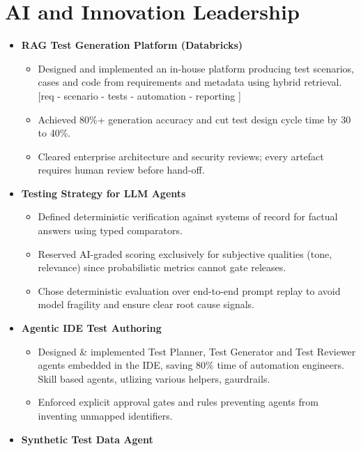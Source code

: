 \documentclass[11pt, a4paper]{article}
\begin{document}
\section{AI and Innovation Leadership}

\begin{itemize}
    \item \textbf{RAG Test Generation Platform (Databricks)}
    \begin{itemize}
        \item Designed and implemented an in-house platform producing test scenarios, cases and code from requirements and metadata using hybrid retrieval. [req - scenario - tests - automation - reporting ]
        \item Achieved 80\%+ generation accuracy and cut test design cycle time by 30 to 40\%.
        \item Cleared enterprise architecture and security reviews; every artefact requires human review before hand-off.
    \end{itemize}
    \item \textbf{Testing Strategy for LLM Agents}
    \begin{itemize}
        \item Defined deterministic verification against systems of record for factual answers using typed comparators.
        \item Reserved AI-graded scoring exclusively for subjective qualities (tone, relevance) since probabilistic metrics cannot gate releases.
        \item Chose deterministic evaluation over end-to-end prompt replay to avoid model fragility and ensure clear root cause signals.
    \end{itemize}
    \item \textbf{Agentic IDE Test Authoring}
    \begin{itemize}
        \item Designed & implemented  Test Planner, Test Generator and Test Reviewer agents embedded in the IDE, saving 80\% time of automation engineers. Skill based agents, utlizing various helpers, gaurdrails.
        \item Enforced explicit approval gates and rules preventing agents from inventing unmapped identifiers.
    \end{itemize}
    \item \textbf{Synthetic Test Data Agent}

\end{itemize}
\end{document}
